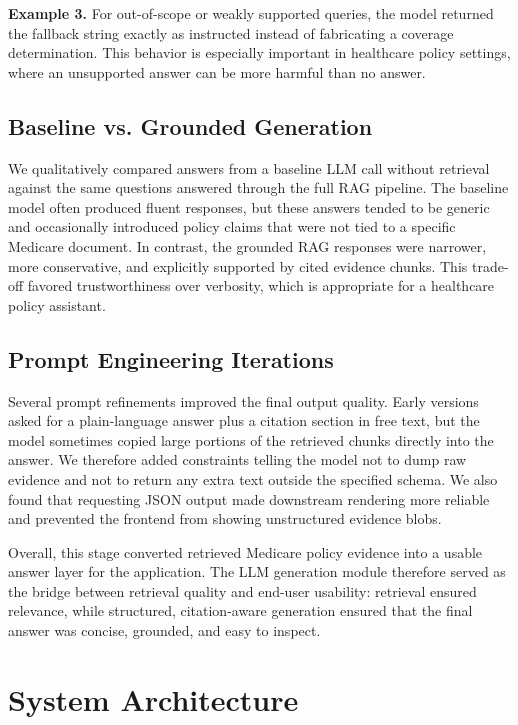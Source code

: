 \documentclass[10pt, letterpaper]{article}
\begin{document}
\textbf{Example 3.} For out-of-scope or weakly supported queries, the model returned the
fallback string exactly as instructed instead of fabricating a coverage determination. This
behavior is especially important in healthcare policy settings, where an unsupported answer
can be more harmful than no answer.

\subsection{Baseline vs. Grounded Generation}

We qualitatively compared answers from a baseline LLM call without retrieval against the
same questions answered through the full RAG pipeline. The baseline model often produced
fluent responses, but these answers tended to be generic and occasionally introduced policy
claims that were not tied to a specific Medicare document. In contrast, the grounded RAG
responses were narrower, more conservative, and explicitly supported by cited evidence
chunks. This trade-off favored trustworthiness over verbosity, which is appropriate for a
healthcare policy assistant.

\subsection{Prompt Engineering Iterations}

Several prompt refinements improved the final output quality. Early versions asked for a
plain-language answer plus a citation section in free text, but the model sometimes copied
large portions of the retrieved chunks directly into the answer. We therefore added
constraints telling the model not to dump raw evidence and not to return any extra text
outside the specified schema. We also found that requesting JSON output made downstream
rendering more reliable and prevented the frontend from showing unstructured evidence
blobs.

Overall, this stage converted retrieved Medicare policy evidence into a usable answer layer
for the application. The LLM generation module therefore served as the bridge between
retrieval quality and end-user usability: retrieval ensured relevance, while structured,
citation-aware generation ensured that the final answer was concise, grounded, and easy to
inspect.

\newpage
\section{System Architecture}
\end{document}
